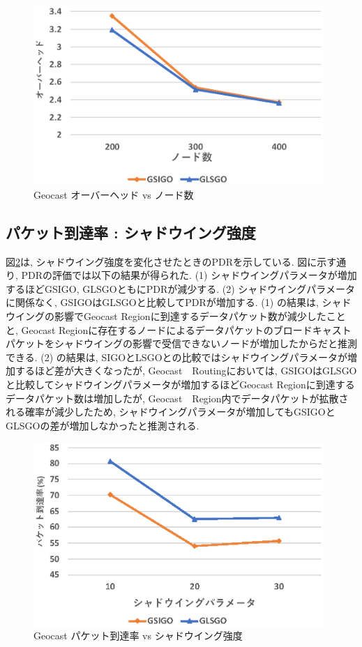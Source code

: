 \documentclass[10pt]{jreport}
\begin{document}
\begin{figure}[!ht]
	\centering
	\includegraphics[width=110mm]{figures/GSIGO_overhead_num.eps}
	\caption{Geocast オーバーヘッド vs ノード数}
	\label{fig:GSIGO_overhead_num}
\end{figure}

\subsection{パケット到達率 : シャドウイング強度}

図\ref{fig:GSIGO_PDR_shadow}は, シャドウイング強度を変化させたときのPDRを示している.
図に示す通り, PDRの評価では以下の結果が得られた.
(1) シャドウイングパラメータが増加するほどGSIGO, GLSGOともにPDRが減少する.
(2) シャドウイングパラメータに関係なく, GSIGOはGLSGOと比較してPDRが増加する.
(1) の結果は, シャドウイングの影響でGeocast Regionに到達するデータパケット数が減少したことと, Geocast Regionに存在するノードによるデータパケットのブロードキャストパケットをシャドウイングの影響で受信できないノードが増加したからだと推測できる.
(2) の結果は, SIGOとLSGOとの比較ではシャドウイングパラメータが増加するほど差が大きくなったが, Geocast　Routingにおいては, GSIGOはGLSGOと比較してシャドウイングパラメータが増加するほどGeocast Regionに到達するデータパケット数は増加したが, Geocast　Region内でデータパケットが拡散される確率が減少したため, シャドウイングパラメータが増加してもGSIGOとGLSGOの差が増加しなかったと推測される. 

\begin{figure}[!ht]
	\centering
	\includegraphics[width=110mm]{figures/GSIGO_PDR_shadow.eps}
	\caption{Geocast パケット到達率 vs シャドウイング強度}
	\label{fig:GSIGO_PDR_shadow}
\end{figure}
\end{document}
